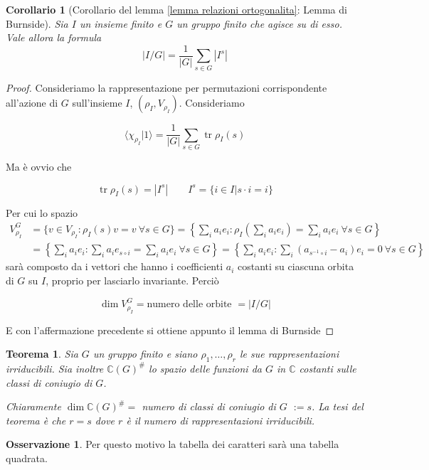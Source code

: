 \documentclass[11pt]{article}
\theoremstyle{plain}
\newtheorem{thm}{Teorema}[section]
\newtheorem*{cor}{Corollario}
\theoremstyle{definition}
\newtheorem*{rem}{Osservazione}
\theoremstyle{remark}
\newcommand{\C}{\mathbb{C}}
\newcommand{\dsum}{\displaystyle\sum}
\DeclareMathOperator{\tr}{tr}
\begin{document}
\begin{cor}[Corollario del lemma \ref{lemma relazioni ortogonalita}: Lemma di Burnside]

Sia $I$ un insieme finito e $G$ un gruppo finito che agisce su di esso. Vale allora la formula
\[ |I/G| = \dfrac{1}{|G|} \dsum_{s\in G} |I^s|\]
\end{cor}

\begin{proof}

Consideriamo la rappresentazione per permutazioni corrispondente all'azione di $G$ sull'insieme $I$, $(\rho_I, V_{\rho_I})$. Consideriamo

\[\langle \chi_{\rho_I} | 1 \rangle = \dfrac{1}{|G|} \dsum_{s\in G} \tr \rho_I(s)\]

Ma è ovvio che 

\[\tr \rho_I(s) = |I^s| \qquad I^s = \{ i \in I | s \cdot i = i\} \]

Per cui lo spazio 
\begin{align*}
V_{\rho_I}^G &= \{v\in V_{\rho_I}:\rho_I(s)v=v\  \forall s\in G\} = \left\{\sum_i a_i e_i :\rho_I\left(\sum_i a_i e_i\right)=\sum_i a_i e_i\ \forall s\in G \right\} \\
&=\left\{\sum_i a_i e_i :\sum_i a_i e_{s\circ i}=\sum_i a_i e_i\ \forall s\in G \right\}= \left\{ \sum_i a_i e_i: \sum_i (a_{s^{-1}\circ i}-a_i)e_i=0\ \forall s\in G \right\}
\end{align*}
sarà composto da i vettori che hanno i coefficienti $a_i$ costanti su ciascuna orbita di $G$ su $I$, proprio per lasciarlo invariante. Perciò 

\[ \dim V_{\rho_I}^G = \text{numero delle orbite } = |I/G|\]

E con l'affermazione precedente si ottiene appunto il lemma di Burnside
\end{proof}



\begin{thm} Sia $G$ un gruppo finito e siano $\rho_1, \ldots , \rho_r$ le sue rappresentazioni irriducibili. Sia inoltre $\C(G)^{\#}$ lo spazio delle funzioni da $G$ in $\C$ costanti sulle classi di coniugio di $G$.

Chiaramente $\dim \C(G)^\# = $ numero di classi di coniugio di $G$ $:= s$. La tesi del teorema è che $r = s$ dove $r$ è il numero di rappresentazioni irriducibili. 
\end{thm}


\begin{rem}
 Per questo motivo la tabella dei caratteri sarà una tabella quadrata.
\end{rem}
\end{document}
